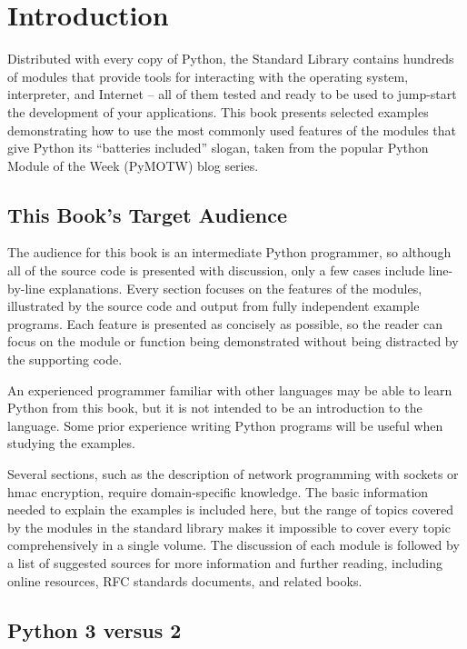 \cleardoublepage
\chapter*{Introduction}

Distributed with every copy of Python, the Standard Library contains
hundreds of modules that provide tools for interacting with the
operating system, interpreter, and Internet – all of them tested and
ready to be used to jump-start the development of your
applications. This book presents selected examples demonstrating how
to use the most commonly used features of the modules that give Python
its ``batteries included'' slogan, taken from the popular Python
Module of the Week (PyMOTW) blog series.

\section*{This Book's Target Audience}

The audience for this book is an intermediate Python programmer, so
although all of the source code is presented with discussion, only a
few cases include line-by-line explanations.  Every section focuses on
the features of the modules, illustrated by the source code and output
from fully independent example programs.  Each feature is presented as
concisely as possible, so the reader can focus on the module or
function being demonstrated without being distracted by the supporting
code.

An experienced programmer familiar with other languages may be able to
learn Python from this book, but it is not intended to be an
introduction to the language.  Some prior experience writing Python
programs will be useful when studying the examples.

Several sections, such as the description of network programming with
sockets or hmac encryption, require domain-specific knowledge.  The
basic information needed to explain the examples is included here, but
the range of topics covered by the modules in the standard library
makes it impossible to cover every topic comprehensively in a single
volume.  The discussion of each module is followed by a list of
suggested sources for more information and further reading, including
online resources, RFC standards documents, and related books.

\section*{Python 3 versus 2}

